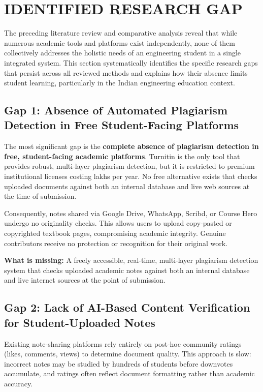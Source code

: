 \documentclass[12,Times new Roman,a4paper]{report}
\begin{document}
\section{IDENTIFIED RESEARCH GAP}

The preceding literature review and comparative analysis reveal that while numerous academic tools and platforms exist independently, none of them collectively addresses the holistic needs of an engineering student in a single integrated system. This section systematically identifies the specific research gaps that persist across all reviewed methods and explains how their absence limits student learning, particularly in the Indian engineering education context.

\subsection{Gap 1: Absence of Automated Plagiarism Detection in Free Student-Facing Platforms}
The most significant gap is the \textbf{complete absence of plagiarism detection in free, student-facing academic platforms}. Turnitin is the only tool that provides robust, multi-layer plagiarism detection, but it is restricted to premium institutional licenses costing lakhs per year. No free alternative exists that checks uploaded documents against both an internal database and live web sources at the time of submission.

Consequently, notes shared via Google Drive, WhatsApp, Scribd, or Course Hero undergo no originality checks. This allows users to upload copy-pasted or copyrighted textbook pages, compromising academic integrity. Genuine contributors receive no protection or recognition for their original work.

\textbf{What is missing:} A freely accessible, real-time, multi-layer plagiarism detection system that checks uploaded academic notes against both an internal database and live internet sources at the point of submission.

\subsection{Gap 2: Lack of AI-Based Content Verification for Student-Uploaded Notes}
Existing note-sharing platforms rely entirely on post-hoc community ratings (likes, comments, views) to determine document quality. This approach is slow: incorrect notes may be studied by hundreds of students before downvotes accumulate, and ratings often reflect document formatting rather than academic accuracy.
\end{document}
